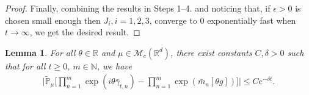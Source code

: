 \documentclass[12pt,a4paper]{amsart}
\theoremstyle{plain}
\newtheorem{lem}[thm]{Lemma}
\theoremstyle{definition}
\numberwithin{equation}{section}
\begin{document}
\begin{proof}
    Finally, combining the results in Steps 1--4. and noticing that, if $\epsilon>0$ is chosen small enough then $J_{i}, i = 1,2,3$, converge to $0$ exponentially fast when $t\rightarrow\infty$, we get the desired result.
\end{proof}

\begin{lem}\label{lem:lemma03}
    For all $\theta\in \mathbb{R}$ and $\mu \in \mathcal{M}_c(\mathbb{R}^d)$, there exist constants $C,\delta>0$ such that for all $t\geq 0$, $m\in\mathbb{N}$, we have
\begin{align}\label{ineq: next we will need}
    \Big|\tilde{\mathbb{P}}_{\mu}\Big[\prod_{n=1}^m\exp(i\theta\bar{\gamma}_{t,n})-\prod_{n=1}^m\exp(\bar{m}_n[\theta g])\Big]\Big|\leq C e^{-\delta t}.
\end{align}
\end{lem}
\end{document}
